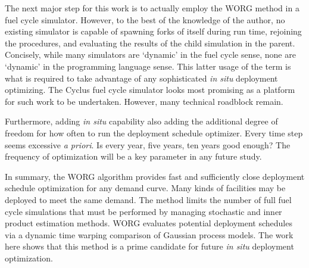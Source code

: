 The next major step for this work is to actually employ the WORG method in 
a fuel cycle simulator.  However, to the best of the knowledge of the 
author, no existing simulator is capable of spawning forks of itself 
during run time, rejoining the procedures, and evaluating the results of the 
child simulation in the parent. Concisely, while many simulators are 
`dynamic' in the fuel cycle sense, none are `dynamic' in the programming
language sense. This latter usage of the term is what is required to 
take advantage of any sophisticated \emph{in situ} deployment optimizing.
The Cyclus fuel cycle simulator looks most promising as a platform
for such work to be undertaken. However, many technical roadblock remain.

Furthermore, adding \emph{in situ} capability also adding the additional 
degree of freedom for how often to run the deployment schedule optimizer.
Every time step seems excessive \emph{a priori}. Is every year, five years,
ten years good enough? The frequency of optimization will be a key 
parameter in any future study.

In summary, the WORG algorithm provides fast and sufficiently close 
deployment schedule optimization for any demand curve.  Many kinds of 
facilities may be deployed to meet the same demand.  The method 
limits the number of full fuel cycle simulations that must be performed by
managing stochastic and inner product estimation methods. WORG
evaluates potential deployment schedules via a dynamic time warping 
comparison of Gaussian process models. The work here shows that this 
method is a prime candidate for future \emph{in situ} deployment 
optimization. 


